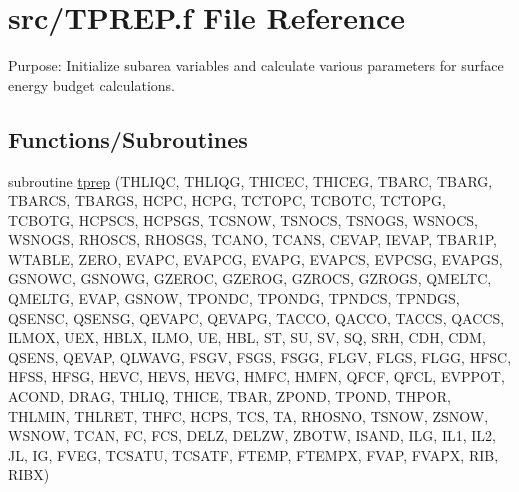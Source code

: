 \hypertarget{TPREP_8f}{}\section{src/\+T\+P\+R\+E\+P.f File Reference}
\label{TPREP_8f}


Purpose\+: Initialize subarea variables and calculate various parameters for surface energy budget calculations.  


\subsection*{Functions/\+Subroutines}
\begin{DoxyCompactItemize}
\item 
subroutine \hyperlink{TPREP_8f_a7e4916d23e9c1a0300f168e58bbf7ae4}{tprep} (T\+H\+L\+I\+Q\+C, T\+H\+L\+I\+Q\+G, T\+H\+I\+C\+E\+C, T\+H\+I\+C\+E\+G, T\+B\+A\+R\+C, T\+B\+A\+R\+G, T\+B\+A\+R\+C\+S, T\+B\+A\+R\+G\+S, H\+C\+P\+C, H\+C\+P\+G, T\+C\+T\+O\+P\+C, T\+C\+B\+O\+T\+C, T\+C\+T\+O\+P\+G, T\+C\+B\+O\+T\+G, H\+C\+P\+S\+C\+S, H\+C\+P\+S\+G\+S, T\+C\+S\+N\+O\+W, T\+S\+N\+O\+C\+S, T\+S\+N\+O\+G\+S, W\+S\+N\+O\+C\+S, W\+S\+N\+O\+G\+S, R\+H\+O\+S\+C\+S, R\+H\+O\+S\+G\+S, T\+C\+A\+N\+O, T\+C\+A\+N\+S, C\+E\+V\+A\+P, I\+E\+V\+A\+P, T\+B\+A\+R1\+P, W\+T\+A\+B\+L\+E, Z\+E\+R\+O, E\+V\+A\+P\+C, E\+V\+A\+P\+C\+G, E\+V\+A\+P\+G, E\+V\+A\+P\+C\+S, E\+V\+P\+C\+S\+G, E\+V\+A\+P\+G\+S, G\+S\+N\+O\+W\+C, G\+S\+N\+O\+W\+G, G\+Z\+E\+R\+O\+C, G\+Z\+E\+R\+O\+G, G\+Z\+R\+O\+C\+S, G\+Z\+R\+O\+G\+S, Q\+M\+E\+L\+T\+C, Q\+M\+E\+L\+T\+G, E\+V\+A\+P, G\+S\+N\+O\+W, T\+P\+O\+N\+D\+C, T\+P\+O\+N\+D\+G, T\+P\+N\+D\+C\+S, T\+P\+N\+D\+G\+S, Q\+S\+E\+N\+S\+C, Q\+S\+E\+N\+S\+G, Q\+E\+V\+A\+P\+C, Q\+E\+V\+A\+P\+G, T\+A\+C\+C\+O, Q\+A\+C\+C\+O, T\+A\+C\+C\+S, Q\+A\+C\+C\+S, I\+L\+M\+O\+X, U\+E\+X, H\+B\+L\+X, I\+L\+M\+O, U\+E, H\+B\+L, S\+T, S\+U, S\+V, S\+Q, S\+R\+H, C\+D\+H, C\+D\+M, Q\+S\+E\+N\+S, Q\+E\+V\+A\+P, Q\+L\+W\+A\+V\+G, F\+S\+G\+V, F\+S\+G\+S, F\+S\+G\+G, F\+L\+G\+V, F\+L\+G\+S, F\+L\+G\+G, H\+F\+S\+C, H\+F\+S\+S, H\+F\+S\+G, H\+E\+V\+C, H\+E\+V\+S, H\+E\+V\+G, H\+M\+F\+C, H\+M\+F\+N, Q\+F\+C\+F, Q\+F\+C\+L, E\+V\+P\+P\+O\+T, A\+C\+O\+N\+D, D\+R\+A\+G, T\+H\+L\+I\+Q, T\+H\+I\+C\+E, T\+B\+A\+R, Z\+P\+O\+N\+D, T\+P\+O\+N\+D, T\+H\+P\+O\+R, T\+H\+L\+M\+I\+N, T\+H\+L\+R\+E\+T, T\+H\+F\+C, H\+C\+P\+S, T\+C\+S, T\+A, R\+H\+O\+S\+N\+O, T\+S\+N\+O\+W, Z\+S\+N\+O\+W, W\+S\+N\+O\+W, T\+C\+A\+N, F\+C, F\+C\+S, D\+E\+L\+Z, D\+E\+L\+Z\+W, Z\+B\+O\+T\+W, I\+S\+A\+N\+D, I\+L\+G, I\+L1, I\+L2, J\+L, I\+G, F\+V\+E\+G, T\+C\+S\+A\+T\+U, T\+C\+S\+A\+T\+F, F\+T\+E\+M\+P, F\+T\+E\+M\+P\+X, F\+V\+A\+P, F\+V\+A\+P\+X, R\+I\+B, R\+I\+B\+X)
\end{DoxyCompactItemize}


